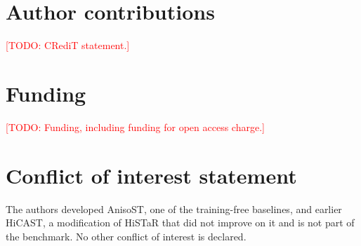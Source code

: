 \documentclass[unnumsec,webpdf,contemporary,large]{oup-authoring-template}
\newcommand{\todo}[1]{\textcolor{red}{[TODO: #1]}}
\begin{document}
\section*{Author contributions}
\todo{CRediT statement.}

\section*{Funding}
\todo{Funding, including funding for open access charge.}

\section*{Conflict of interest statement}
The authors developed AnisoST, one of the training-free baselines, and earlier HiCAST, a modification of HiSTaR that did not improve on it and is not part of the benchmark. No other conflict of interest is declared.



\end{document}
